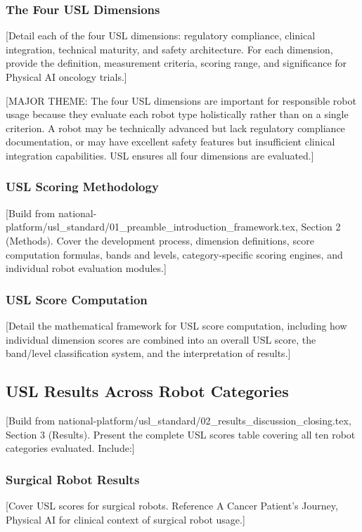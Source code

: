 \subsubsection{The Four USL Dimensions}
[Detail each of the four USL dimensions: regulatory compliance, clinical
integration, technical maturity, and safety architecture. For each dimension,
provide the definition, measurement criteria, scoring range, and significance
for Physical AI oncology trials.]

[MAJOR THEME: The four USL dimensions are important for responsible robot usage
because they evaluate each robot type holistically rather than on a single
criterion. A robot may be technically advanced but lack regulatory compliance
documentation, or may have excellent safety features but insufficient clinical
integration capabilities. USL ensures all four dimensions are evaluated.]

\subsubsection{USL Scoring Methodology}
[Build from national-platform/usl\_standard/01\_preamble\_introduction\_framework.tex,
Section 2 (Methods). Cover the development process, dimension definitions,
score computation formulas, bands and levels, category-specific scoring
engines, and individual robot evaluation modules.]

\subsubsection{USL Score Computation}
[Detail the mathematical framework for USL score computation, including how
individual dimension scores are combined into an overall USL score, the
band/level classification system, and the interpretation of results.]

\subsection{USL Results Across Robot Categories}
\label{subsec:usl-results}

[Build from national-platform/usl\_standard/02\_results\_discussion\_closing.tex,
Section 3 (Results). Present the complete USL scores table covering all ten
robot categories evaluated. Include:]

\subsubsection{Surgical Robot Results}
[Cover USL scores for surgical robots. Reference A Cancer Patient's Journey,
Physical AI \cite{patient-journey-paper} for clinical context of surgical
robot usage.]

